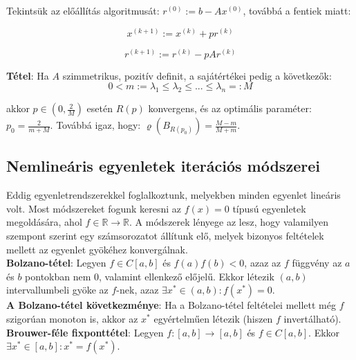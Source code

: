 \documentclass[margin=0px]{article}
\begin{document}
	\noindent Tekintsük az előállítás algoritmusát: $r^{(0)} := b - Ax^{(0)}$, továbbá a fentiek miatt:
	
	\begin{displaymath}
		x^{(k+1)} := x^{(k)} + pr^{(k)}
	\end{displaymath}
	
	\begin{displaymath}
		r^{(k+1)} := r^{(k)} - pAr^{(k)}
	\end{displaymath}
	
	\noindent \textbf{Tétel}: Ha $A$ szimmetrikus, pozitív definit, a sajátértékei pedig a következők:
	\begin{displaymath}
		0 < m := \lambda_{1} \leq \lambda_{2} \leq ... \leq \lambda_{n} =: M
	\end{displaymath}
	
	\noindent akkor $p \in (0,\frac{2}{M})$ esetén $R(p)$ konvergens, és az optimális paraméter: $p_{0} = \frac{2}{m + M}$.
	Továbbá igaz, hogy: $\varrho(B_{R(p_{0})}) = \frac{M - m}{M + m}$.
	
	\subsection{Nemlineáris egyenletek iterációs módszerei}
	
	Eddig egyenletrendszerekkel foglalkoztunk, melyekben minden egyenlet lineáris volt. Most módszereket
	fogunk keresni az $f(x) = 0$ típusú egyenletek megoldására, ahol $f \in \mathbb{R} \to \mathbb{R}$. A módszerek
	lényege az lesz, hogy valamilyen szempont szerint egy számsorozatot állítunk elő, melyek bizonyos
	feltételek mellett az egyenlet gyökéhez konvergálnak.\\
	
	\noindent \textbf{Bolzano-tétel}: Legyen $f \in C[a,b]$ és $f(a)f(b) <0$, azaz az $f$ függvény az $a$ és $b$
	pontokban nem $0$, valamint ellenkező előjelű. Ekkor létezik $(a,b)$ intervallumbeli gyöke az $f$-nek, azaz
	$\exists x^{*} \in (a,b): f(x^{*}) = 0$.\\
	
	\noindent \textbf{A Bolzano-tétel következménye}: Ha a Bolzano-tétel feltételei mellett még $f$ szigorúan monoton is, akkor
	az $x^{*}$ egyértelműen létezik (hiszen $f$ invertálható).\\
	
	\noindent \textbf{Brouwer-féle fixponttétel}: Legyen $f : [a,b] \to [a,b]$ és $f \in C[a,b]$. Ekkor $\exists
	 x^{*} \in [a,b]: x^{*} = f(x^{*})$.\\
	 
\end{document}
